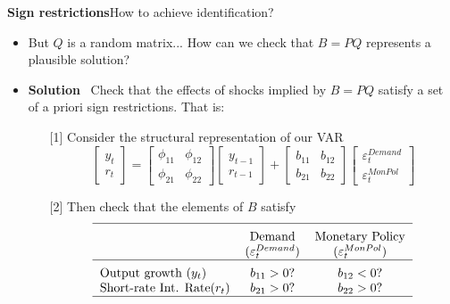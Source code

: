 \begin{frame}
{\textbf{Sign restrictions}}{How to achieve identification?}

\begin{itemize}
\item But $Q$ is a random matrix... How can we check that $B=PQ$ represents
a plausible solution?\medskip \pause

\item \textbf{Solution} \ Check that the effects of shocks implied by $B=PQ$
satisfy a set of a priori sign restrictions. That is:\medskip \pause

\begin{itemize}
\item[{[1]}] Consider the structural representation of our VAR%
\begin{equation*}
\left[ 
\begin{array}{c}
y_{t} \\ 
r_{t}%
\end{array}%
\right] =%
\begin{bmatrix}
\phi _{11} & \phi _{12} \\ 
\phi _{21} & \phi _{22}%
\end{bmatrix}%
\left[ 
\begin{array}{c}
y_{t-1} \\ 
r_{t-1}%
\end{array}%
\right] +\left[ 
\begin{array}{cc}
b_{11} & b_{12} \\ 
b_{21} & b_{22}%
\end{array}%
\right] 
\begin{bmatrix}
\varepsilon _{t}^{Demand} \\ 
\varepsilon _{t}^{MonPol}%
\end{bmatrix}%
\end{equation*}%
\pause

\item[{[2]}] Then check that the elements of $B$ satisfy\smallskip 
\begin{equation*}
\begin{tabular}{lcc}
\hline
\addlinespace & Demand & Monetary Policy \\ 
& ($\varepsilon _{t}^{Demand}$) & ($\varepsilon _{t}^{MonPol}$) \\ \hline
\addlinespace Output growth ($y_{t}$) & $b_{11}>0$? & $b_{12}<0$? \\ 
Short-rate Int. Rate($r_{t}$) & $b_{21}>0$? & $b_{22}>0$? \\ \hline
\end{tabular}%
\end{equation*}
\end{itemize}
\end{itemize}
\end{frame}

